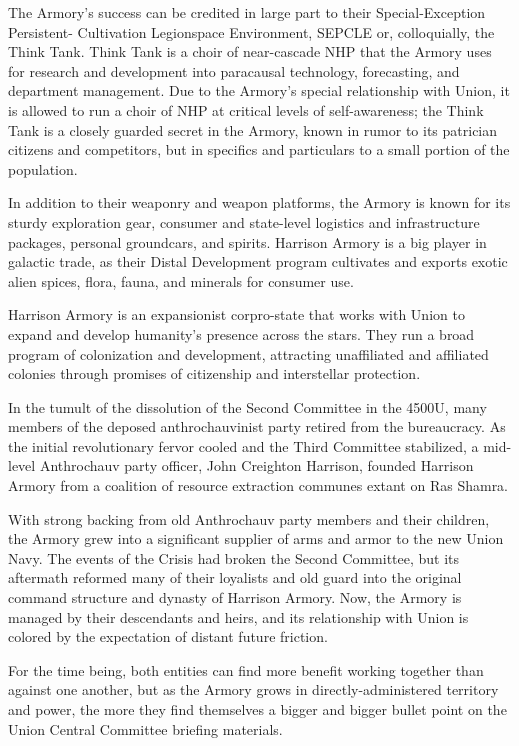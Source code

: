 The Armory's success can be credited in large part to their Special-Exception Persistent-
Cultivation Legionspace Environment, SEPCLE or, colloquially, the Think Tank. Think Tank is a
choir of near-cascade NHP that the Armory uses for research and development into paracausal
technology, forecasting, and department management. Due to the Armory's special relationship
with Union, it is allowed to run a choir of NHP at critical levels of self-awareness; the Think Tank is
a closely guarded secret in the Armory, known in rumor to its patrician citizens and competitors,
but in specifics and particulars to a small portion of the population.

In addition to their weaponry and weapon platforms, the Armory is known for its sturdy exploration
gear, consumer and state-level logistics and infrastructure packages, personal groundcars, and
spirits. Harrison Armory is a big player in galactic trade, as their Distal Development program
cultivates and exports exotic alien spices, flora, fauna, and minerals for consumer use.

Harrison Armory is an expansionist corpro-state that works with Union to expand and develop
humanity's presence across the stars. They run a broad program of colonization and
development, attracting unaffiliated and affiliated colonies through promises of citizenship and
interstellar protection.

In the tumult of the dissolution of the Second Committee in the 4500U, many members of the
deposed anthrochauvinist party retired from the bureaucracy. As the initial revolutionary fervor
cooled and the Third Committee stabilized, a mid-level Anthrochauv party officer, John Creighton
Harrison, founded Harrison Armory from a coalition of resource extraction communes extant on
Ras Shamra.

With strong backing from old Anthrochauv party members and their children, the Armory grew
into a significant supplier of arms and armor to the new Union Navy. The events of the Crisis had
broken the Second Committee, but its aftermath reformed many of their loyalists and old guard
into the original command structure and dynasty of Harrison Armory. Now, the Armory is
managed by their descendants and heirs, and its relationship with Union is colored by the
expectation of distant future friction.

For the time being, both entities can find more benefit working together than against one another,
but as the Armory grows in directly-administered territory and power, the more they find
themselves a bigger and bigger bullet point on the Union Central Committee briefing materials.


